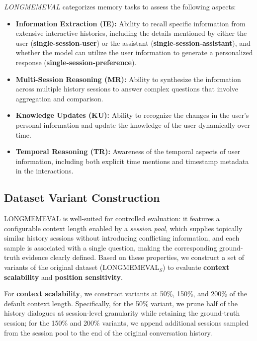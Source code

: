 \noindent \textit{LONGMEMEVAL} categorizes memory tasks to assess the following aspects:
\begin{itemize}[topsep=1mm, partopsep=0pt, itemsep=0pt, leftmargin=10pt]
    \item \textbf{Information Extraction (IE):} Ability to recall specific information from extensive interactive histories, including the details mentioned by either the user (\textbf{single-session-user}) or the assistant (\textbf{single-session-assistant}), and whether the model can utilize the user information to generate a personalized response (\textbf{single-session-preference}).
    \item \textbf{Multi-Session Reasoning (MR):} Ability to synthesize the information across multiple history sessions to answer complex questions that involve aggregation and comparison.
    \item \textbf{Knowledge Updates (KU):} Ability to recognize the changes in the user’s personal information and update the knowledge of the user dynamically over time.
    \item \textbf{Temporal Reasoning (TR):} Awareness of the temporal aspects of user information, including both explicit time mentions and timestamp metadata in the interactions.
\end{itemize}




\subsection{Dataset Variant Construction}
\label{sec:app:exp:construct}

\noindent LONGMEMEVAL is well-suited for controlled evaluation: it features a configurable context length enabled by a \emph{session pool}, which supplies topically similar history sessions without introducing conflicting information, and each sample is associated with a single question, making the corresponding ground-truth evidence clearly defined. Based on these properties, we construct a set of variants of the original dataset (LONGMEMEVAL$_S$) to evaluate \textbf{context scalability} and \textbf{position sensitivity}.

For \textbf{context scalability}, we construct variants at 50\%, 150\%, and 200\% of the default context length. Specifically, for the 50\% variant, we prune half of the history dialogues at session-level granularity while retaining the ground-truth session; for the 150\% and 200\% variants, we append additional sessions sampled from the session pool to the end of the original conversation history.

